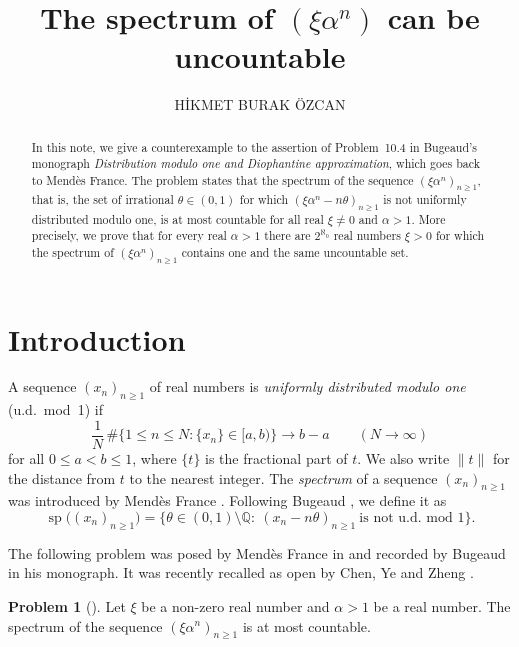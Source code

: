 \documentclass[11pt,reqno]{amsart}
\title[The spectrum of $(\xi\alpha^n)$ can be uncountable]{The spectrum of $(\xi\alpha^n)$ can be uncountable}
\author{H\.IKMET BURAK \"OZCAN}
\date{}
\theoremstyle{definition}
\newtheorem*{problemstar}{Problem}
\theoremstyle{remark}
\numberwithin{equation}{section}
\DeclareMathOperator{\spec}{sp}
\newcommand{\Q}{\mathbb{Q}}
\begin{document}
\begin{abstract}
In this note, we give a counterexample to the assertion of Problem~10.4 in Bugeaud's monograph \emph{Distribution modulo one and Diophantine approximation}, which goes back to Mend\`es France. The problem states that the spectrum of the sequence $(\xi\alpha^n)_{n\ge1}$, that is, the set of irrational $\theta\in(0,1)$ for which $(\xi\alpha^n-n\theta)_{n\ge1}$ is not uniformly distributed modulo one, is at most countable for all real $\xi\ne0$ and $\alpha>1$. More precisely, we prove that for every real $\alpha>1$ there are $2^{\aleph_0}$ real numbers $\xi>0$ for which the spectrum of $(\xi\alpha^n)_{n\ge1}$ contains one and the same uncountable set.
\end{abstract}

\maketitle

\section{Introduction}

A sequence $(x_n)_{n\ge1}$ of real numbers is \emph{uniformly distributed modulo one} (u.d.\ mod~1) if
\begin{equation}\label{eq:ud}
\frac1N\,\#\bigl\{1\le n\le N:\{x_n\}\in[a,b)\bigr\}\longrightarrow b-a\qquad(N\to\infty)
\end{equation}
for all $0\le a<b\le1$, where $\{t\}$ is the fractional part of $t$. We also write $\|t\|$ for the distance from $t$ to the nearest integer. The \emph{spectrum} of a sequence $(x_n)_{n\ge1}$ was introduced by Mend\`es France \cite{MFa}. Following Bugeaud \cite{Bu}, we define it as
\[
\spec\bigl((x_n)_{n\ge1}\bigr)=\bigl\{\theta\in(0,1)\setminus\Q:\ (x_n-n\theta)_{n\ge1}\ \text{is not u.d.\ mod }1\bigr\}.
\]

The following problem was posed by Mend\`es France in \cite{MF} and recorded by Bugeaud in his monograph. It was recently recalled as open by Chen, Ye and Zheng \cite{CYZ}.

\begin{problemstar}[{\cite[Problem~10.4]{Bu}}]
Let $\xi$ be a non-zero real number and $\alpha>1$ be a real number. The spectrum of the sequence $(\xi\alpha^n)_{n\ge1}$ is at most countable.
\end{problemstar}
\end{document}
